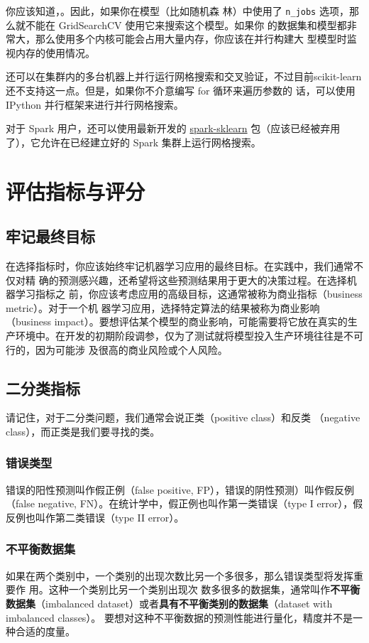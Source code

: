 你应该知道，。因此，如果你在模型（比如随机森
林）中使用了 \verb|n_jobs| 选项，那么就不能在 GridSearchCV 使用它来搜索这个模型。如果你
的数据集和模型都非常大，那么使用多个内核可能会占用大量内存，你应该在并行构建大
型模型时监视内存的使用情况。

还可以在集群内的多台机器上并行运行网格搜索和交叉验证，不过目前scikit-learn 还不支持这一点。但是，如果你不介意编写 for 循环来遍历参数的
话，可以使用 IPython 并行框架来进行并行网格搜索。

对于 Spark 用户，还可以使用最新开发的 \href{https://github.com/databricks/spark-sklearn}{spark-sklearn} 包（应该已经被弃用了），它允许在已经建立好的 Spark 集群上运行网格搜索。
\section{评估指标与评分}
\subsection{牢记最终目标}
在选择指标时，你应该始终牢记机器学习应用的最终目标。在实践中，我们通常不仅对精
确的预测感兴趣，还希望将这些预测结果用于更大的决策过程。在选择机器学习指标之
前，你应该考虑应用的高级目标，这通常被称为商业指标（business metric）。对于一个机
器学习应用，选择特定算法的结果被称为商业影响（business impact）。要想评估某个模型的商业影响，可能需要将它放在真实的生产环境中。在开发的初期阶段调参，仅为了测试就将模型投入生产环境往往是不可行的，因为可能涉
及很高的商业风险或个人风险。
\subsection{二分类指标}
请记住，对于二分类问题，我们通常会说正类（positive class）和反类
（negative class），而正类是我们要寻找的类。
\subsubsection{错误类型}
错误的阳性预测叫作假正例（false positive, FP），错误的阴性预测）叫作假反例（false negative, FN）。在统计学中，假正例也叫作第一类错误（type I
error），假反例也叫作第二类错误（type II error）。
\subsubsection{不平衡数据集}
如果在两个类别中，一个类别的出现次数比另一个多很多，那么错误类型将发挥重要作
用。这种一个类别比另一个类别出现次
数多很多的数据集，通常叫作\textbf{不平衡数据集}（imbalanced dataset）或者\textbf{具有不平衡类别的数据集}（dataset with imbalanced classes）。
要想对这种不平衡数据的预测性能进行量化，精度并不是一种合适的度量。
